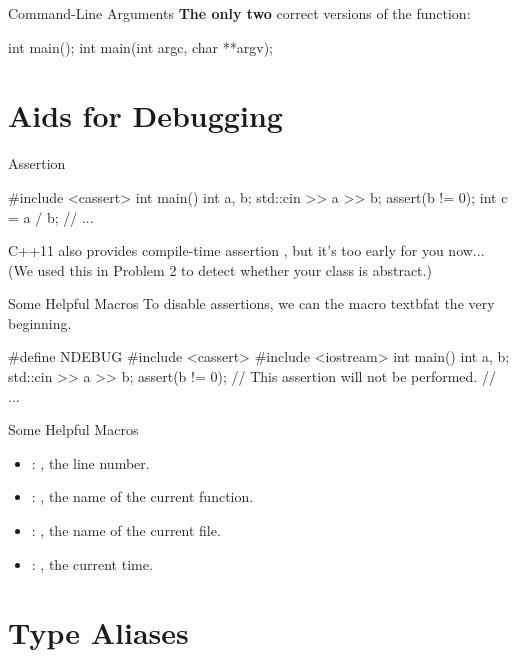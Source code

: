\documentclass{beamer}
\begin{document}
\begin{frame}[fragile]{Command-Line Arguments}
    \textbf{The only two} correct versions of the  function:
    \begin{cpp}
int main();
int main(int argc, char **argv);
    \end{cpp}
\end{frame}

\section{Aids for Debugging}

\begin{frame}[fragile]{Assertion}
    \begin{cpp}
#include <cassert>
int main() {
  int a, b;
  std::cin >> a >> b;
  assert(b != 0);
  int c = a / b;
  // ...
}
    \end{cpp}
    C++11 also provides compile-time assertion , but it's too early for you now... (We used this in Problem 2 to detect whether your  class is abstract.)
\end{frame}

\begin{frame}[fragile]{Some Helpful Macros}
    To disable assertions, we can  the  macro textbf{at the very beginning}.
    \begin{cpp}
#define NDEBUG
#include <cassert>
#include <iostream>
int main() {
  int a, b;
  std::cin >> a >> b;
  assert(b != 0); // This assertion will not be performed.
  // ...
}
    \end{cpp}
\end{frame}

\begin{frame}[fragile]{Some Helpful Macros}
    \begin{itemize}
        \item {}: , the line number.
        \item {}: \const{}\ttt{[]}, the name of the current function.
        \item {}: \const{}\ttt{[]}, the name of the current file.
        \item {}: \const{}\ttt{[]}, the current time.
    \end{itemize}
\end{frame}

\section{Type Aliases}
\end{document}
